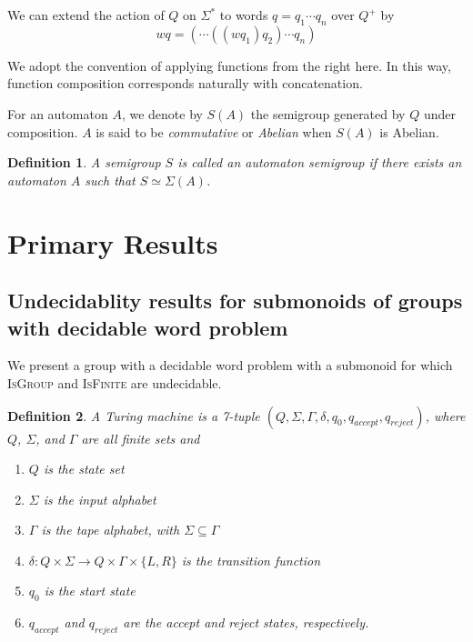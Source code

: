 \documentclass[10pt,a4paper]{article} %
\theoremstyle{pleasant}
\newtheorem{definition}{Definition}
\newcommand{\defn}[1]{\textit{#1}}
\begin{document}
    We can extend the action of $Q$ on $\Sigma^*$ to words $q = q_1\cdots q_n$ over $Q^+$ by \[ wq = (\cdots((w q_1) q_2)\cdots q_n) \]

    We adopt the convention of applying functions from the right here. In this way, function composition corresponds naturally with concatenation.

    For an automaton $A$, we denote by $S(A)$ the semigroup generated by $Q$ under composition. $A$ is said to be \defn{commutative} or \defn{Abelian} when $S(A)$ is Abelian.

    \begin{definition}
    A semigroup $S$ is called an \defn{automaton semigroup} if there exists an automaton $A$ such that $S \simeq \Sigma(A)$.
    \end{definition}


    \section{Primary Results}

    \subsection{Undecidablity results for submonoids of groups with decidable word problem}

    We present a group with a decidable word problem with a submonoid for which \textsc{IsGroup} and \textsc{IsFinite} are undecidable. 

    \begin{definition}
    A \defn{Turing machine} is a 7-tuple $(Q, \Sigma, \Gamma, \delta, q_0, q_{accept}, q_{reject})$, where $Q$, $\Sigma$, and $\Gamma$ are all finite sets and 
    \begin{enumerate}
    \item $Q$ is the state set
    \item $\Sigma$ is the input alphabet
    \item $\Gamma$ is the tape alphabet, with $\Sigma \subseteq \Gamma$
    \item $\delta : Q \times \Sigma \rightarrow Q \times \Gamma \times \{L, R \}$ is the transition function
    \item $q_0$ is the start state
    \item $q_{accept}$ and $q_{reject}$ are the accept and reject states, respectively.
    \end{enumerate}
    \end{definition}
\end{document}
